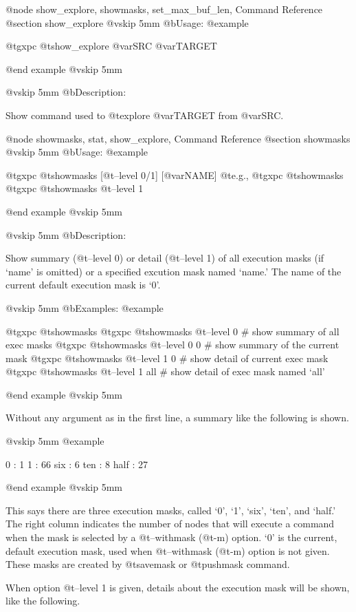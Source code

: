 @node show_explore, showmasks, set_max_buf_len, Command Reference
@section show_explore
@vskip 5mm
@b{Usage:}
@example

  @t{gxpc} @t{show_explore} @var{SRC} @var{TARGET}

@end example
@vskip 5mm

@vskip 5mm
@b{Description:}


  Show command used to @t{explore} @var{TARGET} from @var{SRC}.

@node showmasks, stat, show_explore, Command Reference
@section showmasks
@vskip 5mm
@b{Usage:}
@example

  @t{gxpc} @t{showmasks} [@t{--level} 0/1] [@var{NAME}]
  @t{e}.g.,
  @t{gxpc} @t{showmasks}
  @t{gxpc} @t{showmasks} @t{--level} 1

@end example
@vskip 5mm

@vskip 5mm
@b{Description:}


  Show summary (@t{--level} 0) or detail (@t{--level} 1) of all execution
masks (if `name' is omitted) or a specified excution mask named
`name.' The name of the current default execution mask is `0'.

@vskip 5mm
@b{Examples:}
@example

  @t{gxpc} @t{showmasks}
  @t{gxpc} @t{showmasks} @t{--level} 0     # show summary of all exec masks
  @t{gxpc} @t{showmasks} @t{--level} 0 0   # show summary of the current mask
  @t{gxpc} @t{showmasks} @t{--level} 1 0   # show detail of current exec mask
  @t{gxpc} @t{showmasks} @t{--level} 1 all # show detail of exec mask named `all'

@end example
@vskip 5mm

Without any argument as in the first line, a summary like the
following is shown.

@vskip 5mm
@example

   0 : 1
   1 : 66
   six : 6
   ten : 8
   half : 27

@end example
@vskip 5mm

This says there are three execution masks, called `0', `1',
`six', `ten', and `half.' The right column indicates the number
of nodes that will execute a command when the mask is selected by
a @t{--withmask} (@t{-m}) option. `0' is the current, default execution
mask, used when @t{--withmask} (@t{-m}) option is not given. These
masks are created by @t{savemask} or @t{pushmask} command.

When option @t{--level} 1 is given, details about the execution mask
will be shown, like the following.

